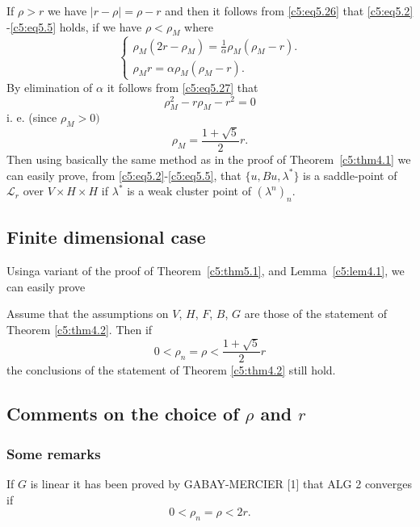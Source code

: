 If $\rho >r$ we have $| r - \rho | = \rho - r $  and then it follows
from \eqref{c5:eq5.26} that \eqref{c5:eq5.2} -\eqref{c5:eq5.5} holds,
if we have $\rho < \rho_M$ where  
\begin{equation*}
\begin{cases}
\rho_M (2r - \rho_M) = \frac{1}{\alpha} \rho_M (\rho_M - r). \\
\rho_M r = \alpha \rho_M (\rho _M - r). \tag{5.27}\label{c5:eq5.27}
\end{cases}
\end{equation*}
By elimination of $\alpha$ it follows from \eqref{c5:eq5.27} that 
$$
\rho^2 _M - r \rho_M - r^2 =0
$$
i. e. (since $\rho_M > 0)$
$$
\rho_M = \frac{1+\sqrt{5}}{2}r. 
$$
Then using basically the same method as in the proof of 
Theorem~\ref{c5:thm4.1} we can easily prove,  from
\eqref{c5:eq5.2}-\eqref{c5:eq5.5},  that $\{u, Bu, \lambda^*\}$ is a
saddle-point of $\mathscr{L}_r$ over $V \times H \times H$ if
$\lambda^*$ is a weak cluster point of $(\lambda^n)_n$.  

\subsection{Finite dimensional case}\label{c5:ss5.3}%
Using\pageoriginale   a variant of the proof of Theorem~\ref{c5:thm5.1},  and 
Lemma~\ref{c5:lem4.1}, we can easily prove 

\begin{theorem}\label{c5:thm5.2}%
Assume that the assumptions  on $V$, $H$, $F$, $B$, $G$ are those of 
the statement of Theorem \ref{c5:thm4.2}.  Then if
$$ 
0 < \rho_n = \rho < \frac{1+ \sqrt{5}}{2}r
$$
the conclusions of the statement of Theorem \ref{c5:thm4.2} still hold.  
\end{theorem}

\subsection{Comments on the choice of $\rho$ and $r$}\label{c5:ss5.4}

\subsubsection{Some remarks}\label{c5:sss5.4.1}

\begin{remark}\label{c5:rem5.1}%
 If $G$ is linear  it has been proved by GABAY-MERCIER [1] that ALG 2 converges if 
 $$
 0 < \rho_n = \rho < 2 r. 
 $$
\end{remark}

